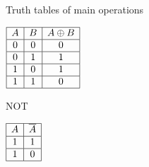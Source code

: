 \begin{namedframe}{Truth tables of main operations}
\begin{center}
\begin{minipage}[t]{0.45\textwidth}
\begin{table}
\begin{math}
						\begin{array}{|c|c|c|}
							\hline
							A & B & A \oplus B\\\hline
							0 & 0 & 0\\\hline
							0 & 1 & 1\\\hline
							1 & 0 & 1\\\hline
							1 & 1 & 0\\\hline
						\end{array}
					\end{math}
				\end{table}
				\vspace{\baselineskip}
				\pause
				\begin{table}
					\caption{NOT}
					\begin{math}
						\begin{array}{|c|c|}
							\hline
							A & \overline{A}\\\hline
							1 & 1\\\hline
							1 & 0\\\hline
						\end{array}
					\end{math}
				\end{table}
			\end{minipage}
		\end{center}
	\end{namedframe}
